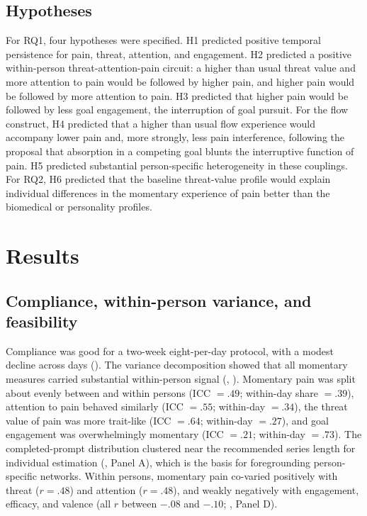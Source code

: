 \documentclass[11pt,a4paper]{article}
\begin{document}
\subsection{Hypotheses}
For RQ1, four hypotheses were specified. H1 predicted positive temporal persistence for pain,
threat, attention, and engagement. H2 predicted a positive within-person threat-attention-pain
circuit: a higher than usual threat value and more attention to pain would be followed by higher
pain, and higher pain would be followed by more attention to pain. H3 predicted that higher pain
would be followed by less goal engagement, the interruption of goal pursuit. For the flow
construct, H4 predicted that a higher than usual flow experience would accompany lower pain and,
more strongly, less pain interference, following the proposal that absorption in a competing goal
blunts the interruptive function of pain. H5 predicted substantial person-specific heterogeneity in
these couplings. For RQ2, H6 predicted that the baseline threat-value profile would explain
individual differences in the momentary experience of pain better than the biomedical or
personality profiles.

\section{Results}

\subsection{Compliance, within-person variance, and feasibility}
Compliance was good for a two-week eight-per-day protocol, with a modest decline across days
(). The variance decomposition showed that all momentary measures carried
substantial within-person signal (, ). Momentary pain was
split about evenly between and within persons (ICC $=.49$; within-day share $=.39$), attention to
pain behaved similarly (ICC $=.55$; within-day $=.34$), the threat value of pain was more
trait-like (ICC $=.64$; within-day $=.27$), and goal engagement was overwhelmingly momentary
(ICC $=.21$; within-day $=.73$). The completed-prompt distribution clustered near the recommended
series length for individual estimation (, Panel A), which is the basis for
foregrounding person-specific networks. Within persons, momentary pain co-varied positively with
threat ($r=.48$) and attention ($r=.48$), and weakly negatively with engagement, efficacy, and
valence (all $r$ between $-.08$ and $-.10$; , Panel D).
\end{document}
